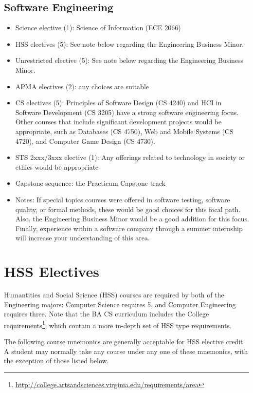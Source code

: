 \documentclass[10pt,letter,twocolumn]{book}
\newenvironment{itemlist}{
\begin{itemize}
\setlength{\itemsep}{0pt}
\setlength{\parskip}{0pt}}
{\end{itemize}}
\newcommand{\mysection}[1]{\section{#1}\renewcommand{\rightmark}{#1}}
\newcommand{\myurl}[1]{\footnote{\scriptsize\url{#1}}}
\begin{document}
\subsection{Software Engineering}
\begin{itemlist}
\item Science elective (1): Science of Information (ECE 2066)
\item HSS electives (5): See note below regarding the Engineering
  Business Minor.
\item Unrestricted elective (5): See note below regarding the
  Engineering Business Minor.
\item APMA electives (2): any choices are suitable
\item CS electives (5): Principles of Software Design (CS 4240) and
  HCI in Software Development (CS 3205) have a strong software
  engineering focus. Other courses that include significant development
  projects would be appropriate, such as Databases (CS 4750), Web and
  Mobile Systems (CS 4720), and Computer Game Design (CS 4730).
\item STS 2xxx/3xxx elective (1): Any offerings related to technology
  in society or ethics would be appropriate
\item Capstone sequence: the Practicum Capstone track
\item Notes: If special topics courses were offered in software
  testing, software quality, or formal methods, these would be good
  choices for this focal path. Also, the Engineering Business Minor
  would be a good addition for this focus. Finally, experience within
  a software company through a summer internship will increase your
  understanding of this area.
\end{itemlist}

\mysection{HSS Electives}

Humantities and Social Science (HSS) courses are required by both of
the Engineering majors: Computer Science requires 5, and Computer
Engineering requires three.  Note that the BA CS curriculum includes
the College
requirements\myurl{http://college.artsandsciences.virginia.edu/requirements/area},
which contain a more in-depth set of HSS type requirements.

The following course mnemonics are generally acceptable for HSS
elective credit. A student may normally take any course under any one
of these mnemonics, with the exception of those listed below.
\end{document}
